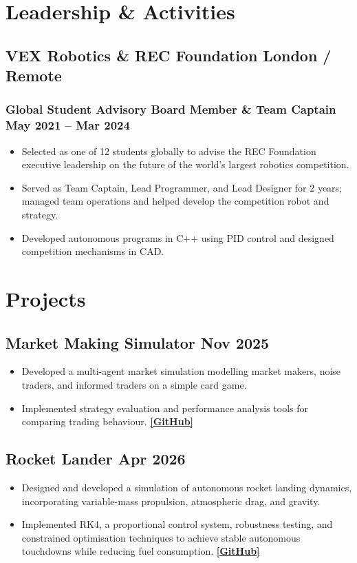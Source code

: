 \documentclass[9pt]{article} %
\begin{document}
\section{Leadership \& Activities}

\subsection{VEX Robotics \& REC Foundation \hfill London / Remote}
\subsubsection{Global Student Advisory Board Member \& Team Captain \hfill May 2021 -- Mar 2024}
\begin{itemize}
    \item Selected as one of 12 students globally to advise the REC Foundation executive leadership on the future of the world's largest robotics competition.
    \item Served as Team Captain, Lead Programmer, and Lead Designer for 2 years; managed team operations and helped develop the competition robot and strategy.
    \item Developed autonomous programs in C++ using PID control and designed competition mechanisms in CAD.
\end{itemize}

\section{Projects}

\subsection{Market Making Simulator \hfill Nov 2025}
\begin{itemize}
    \item Developed a multi-agent market simulation modelling market makers, noise traders, and informed traders on a simple card game.
    \item Implemented strategy evaluation and performance analysis tools for comparing trading behaviour. {\small\href{https://github.com/Harik-S/oafbc-project/tree/game-implementation}{\textbf{[GitHub]}}}
\end{itemize}

\subsection{Rocket Lander \hfill Apr 2026}
\begin{itemize}
    \item Designed and developed a simulation of autonomous rocket landing dynamics, incorporating variable-mass propulsion, atmospheric drag, and gravity.
    \item Implemented RK4, a proportional control system, robustness testing, and constrained optimisation techniques to achieve stable autonomous touchdowns while reducing fuel consumption. {\small\href{https://github.com/Harik-S/touch-down}{\textbf{[GitHub]}}}
\end{itemize}
\end{document}
